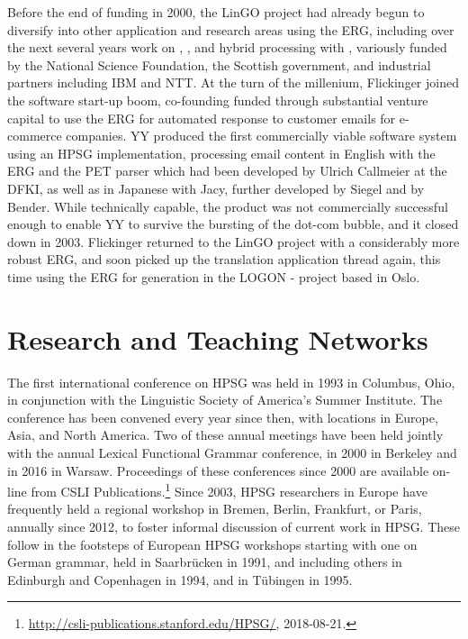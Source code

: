 \documentclass[output=paper
                ,modfonts
                ,nonflat
	        ,collection
	        ,collectionchapter
	        ,collectiontoclongg
 	        ,biblatex
                ,babelshorthands
                ,newtxmath
                ,draftmode
                ,colorlinks, citecolor=brown
]{./langsci/langscibook}
\begin{document}
Before the end of \verbmobil funding in 2000, the LinGO project had already begun to diversify into other application and research areas using the ERG, including over the next several years work on , , and hybrid processing with , variously funded by the National Science Foundation, the Scottish government, and industrial partners including IBM and NTT.  At the turn of the millenium, Flickinger joined the software start-up boom, co-founding  funded through substantial venture capital to use the ERG for automated response to customer emails for e-commerce companies.  YY produced the first commercially viable software system using an HPSG implementation, processing email content in English with the ERG and the PET parser \citep{callmeier00} which had been developed by Ulrich Callmeier at the DFKI, as well as in Japanese with Jacy, further developed by Siegel and by Bender.  While technically capable, the product was not commercially successful enough to enable YY to survive the bursting of the dot-com bubble, and it closed down in 2003.  Flickinger returned to the LinGO project with a considerably more robust ERG, and soon picked up the translation application thread again, this time using the ERG for generation in the LOGON -  project \citep{Lon:Oep:Ber:04} based in Oslo.


\section{Research and Teaching Networks}

The first international conference on HPSG was held in 1993 in Columbus, Ohio, in conjunction with the Linguistic Society of America's Summer Institute.  The conference has been convened every year since then, with locations in Europe, Asia, and North America.  Two of these annual meetings have been held jointly with the annual Lexical Functional Grammar conference, in 2000 in Berkeley and in 2016 in Warsaw.  Proceedings of these conferences since 2000 are available on-line from CSLI Publications.\footnote{\url{http://csli-publications.stanford.edu/HPSG/}, 2018-08-21.}  Since 2003, HPSG researchers in Europe have frequently held a regional workshop in Bremen, Berlin, Frankfurt, or Paris, annually since 2012, to foster informal discussion of current work in HPSG.  These follow in the footsteps of European HPSG workshops starting with one on German grammar, held in Saarbr{\"u}cken in 1991, and including others in Edinburgh and Copenhagen in 1994, and in T{\"u}bingen in 1995.
\end{document}
